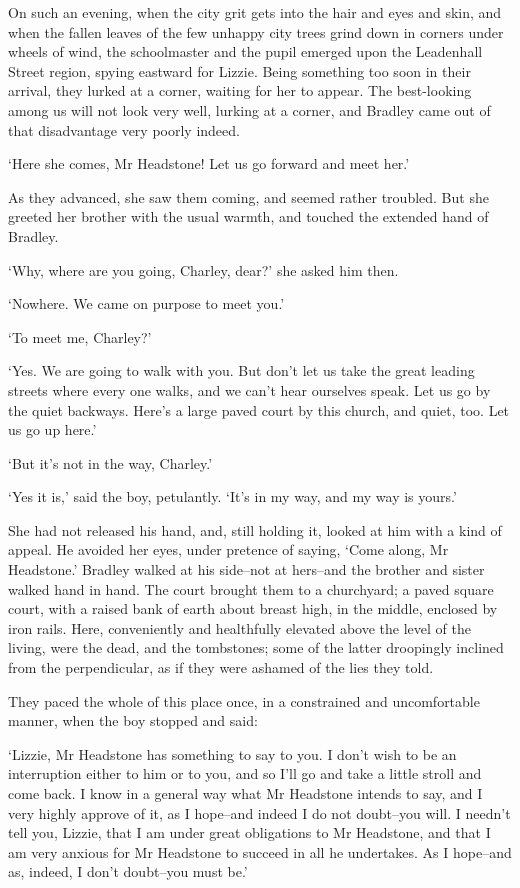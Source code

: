 On such an evening, when the city grit gets into the hair and eyes and
skin, and when the fallen leaves of the few unhappy city trees grind
down in corners under wheels of wind, the schoolmaster and the pupil
emerged upon the Leadenhall Street region, spying eastward for Lizzie.
Being something too soon in their arrival, they lurked at a corner,
waiting for her to appear. The best-looking among us will not look very
well, lurking at a corner, and Bradley came out of that disadvantage
very poorly indeed.

‘Here she comes, Mr Headstone! Let us go forward and meet her.’

As they advanced, she saw them coming, and seemed rather troubled. But
she greeted her brother with the usual warmth, and touched the extended
hand of Bradley.

‘Why, where are you going, Charley, dear?’ she asked him then.

‘Nowhere. We came on purpose to meet you.’

‘To meet me, Charley?’

‘Yes. We are going to walk with you. But don’t let us take the great
leading streets where every one walks, and we can’t hear ourselves
speak. Let us go by the quiet backways. Here’s a large paved court by
this church, and quiet, too. Let us go up here.’

‘But it’s not in the way, Charley.’

‘Yes it is,’ said the boy, petulantly. ‘It’s in my way, and my way is
yours.’

She had not released his hand, and, still holding it, looked at him with
a kind of appeal. He avoided her eyes, under pretence of saying, ‘Come
along, Mr Headstone.’ Bradley walked at his side--not at hers--and the
brother and sister walked hand in hand. The court brought them to a
churchyard; a paved square court, with a raised bank of earth about
breast high, in the middle, enclosed by iron rails. Here, conveniently
and healthfully elevated above the level of the living, were the dead,
and the tombstones; some of the latter droopingly inclined from the
perpendicular, as if they were ashamed of the lies they told.

They paced the whole of this place once, in a constrained and
uncomfortable manner, when the boy stopped and said:

‘Lizzie, Mr Headstone has something to say to you. I don’t wish to be an
interruption either to him or to you, and so I’ll go and take a little
stroll and come back. I know in a general way what Mr Headstone intends
to say, and I very highly approve of it, as I hope--and indeed I do
not doubt--you will. I needn’t tell you, Lizzie, that I am under great
obligations to Mr Headstone, and that I am very anxious for Mr Headstone
to succeed in all he undertakes. As I hope--and as, indeed, I don’t
doubt--you must be.’

